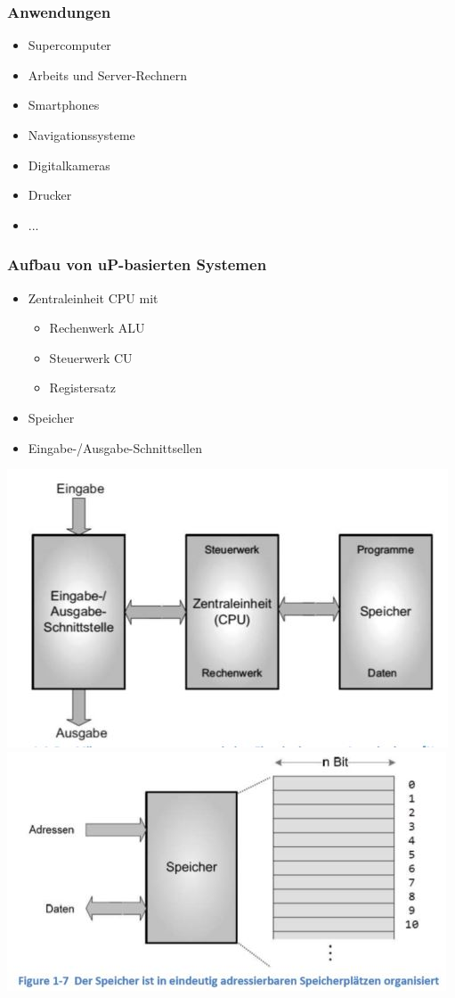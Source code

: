 \begin{multicols}{2}
\subsubsection{Anwendungen}
\begin{minipage}{\linewidth}
\begin{itemize}
    \item Supercomputer
    \item Arbeits und Server-Rechnern
    \item Smartphones
    \item Navigationssysteme
    \item Digitalkameras
    \item Drucker
    \item ...
\end{itemize}
\end{minipage}

\begin{minipage}{\linewidth}
\subsubsection{Aufbau von uP-basierten Systemen}
\begin{itemize}
    \item Zentraleinheit CPU mit
    \begin{itemize}
        \item Rechenwerk ALU
        \item Steuerwerk CU
        \item Registersatz
    \end{itemize}
    \item Speicher
    \item Eingabe-/Ausgabe-Schnittsellen
\end{itemize}
\end{minipage}
\end{multicols}

\includegraphics[width=0.5\linewidth]{images/aufbauuC1}
\includegraphics[width=0.5\linewidth]{images/aufbauuCspeicher}


